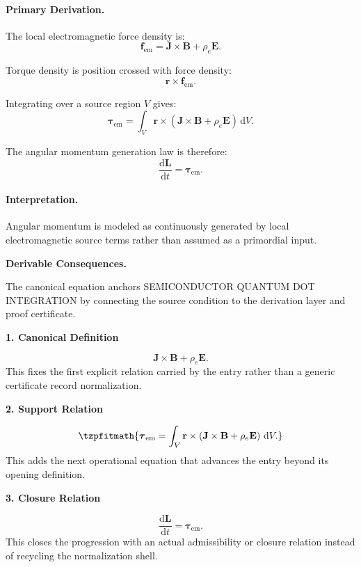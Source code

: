 \paragraph{Primary Derivation.}
The local electromagnetic force density is:
\begin{equation}
\mathbf{f}_{\mathrm{em}}
=
\mathbf{J}\times\mathbf{B}
+
\rho_e\mathbf{E}.
\end{equation}

Torque density is position crossed with force density:
\begin{equation}
\mathbf{r}\times\mathbf{f}_{\mathrm{em}}.
\end{equation}

Integrating over a source region $V$ gives:
\begin{equation}
\boldsymbol{\tau}_{\mathrm{em}}
=
\int_V
\mathbf{r}\times
\left(
\mathbf{J}\times\mathbf{B}
+
\rho_e\mathbf{E}
\right)
\,\mathrm{d}V .
\end{equation}

The angular momentum generation law is therefore:
\begin{equation}
\boxed{
\frac{\mathrm{d}\mathbf{L}}{\mathrm{d}t}
=
\boldsymbol{\tau}_{\mathrm{em}} .
}
\end{equation}

\paragraph{Interpretation.}
Angular momentum is modeled as continuously generated by local electromagnetic source terms rather than assumed as a primordial input.

\par\vspace{0.35em}
\noindent\textbf{Derivable Consequences.}\quad
\begingroup
\footnotesize
\raggedright
The canonical equation anchors SEMICONDUCTOR QUANTUM DOT INTEGRATION by connecting the source condition to the derivation layer and proof certificate.
\par\endgroup

\noindent\textbf{1. Canonical Definition}\par
\[
\mathbf{J}\times\mathbf{B} + \rho_e\mathbf{E}.
\]
\noindent This fixes the first explicit relation carried by the entry rather than a generic certificate record normalization.\par
\noindent\textbf{2. Support Relation}\par
\[
\tzpfitmath{\boldsymbol{\tau}_{\mathrm{em}} = \int_V \mathbf{r}\times \left( \mathbf{J}\times\mathbf{B} + \rho_e\mathbf{E} \right) \,\mathrm{d}V.}
\]
\noindent This adds the next operational equation that advances the entry beyond its opening definition.\par
\noindent\textbf{3. Closure Relation}\par
\[
\frac{\mathrm{d}\mathbf{L}}{\mathrm{d}t} = \boldsymbol{\tau}_{\mathrm{em}}.
\]
\noindent This closes the progression with an actual admissibility or closure relation instead of recycling the normalization shell.\par

